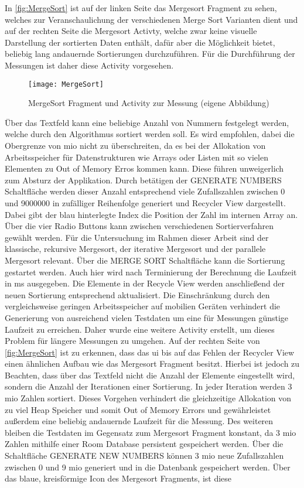 In \autoref{fig:MergeSort} ist auf der linken Seite das Mergesort Fragment zu sehen, welches zur Veranschaulichung der verschiedenen Merge Sort Varianten dient und auf der rechten Seite die Mergesort Activty, welche zwar keine visuelle Darstellung der sortierten Daten enthält, dafür aber die Möglichkeit bietet, beliebig lang andauernde Sortierungen durchzuführen. Für die Durchführung der Messungen ist daher diese Activity vorgesehen.
\begin{figure}[H]
\begin{center}
	\texttt{[image: MergeSort]}
	\caption{MergeSort Fragment und Activity zur Messung (eigene Abbildung)}
	\label{fig:MergeSort} 
\end{center}
\end{figure}
Über das Textfeld kann eine beliebige Anzahl von Nummern festgelegt werden, welche durch den Algorithmus sortiert werden soll. Es wird empfohlen, dabei die Obergrenze von  \ac{mio} nicht zu überschreiten, da es bei der Allokation von Arbeitsspeicher für Datenstrukturen wie Arrays oder Listen mit so vielen Elementen zu Out of Memory Erros kommen kann. Diese führen unweigerlich zum Absturz der Applikation. Durch betätigen der \glqq GENERATE NUMBERS\grqq{} Schaltfläche werden dieser Anzahl entsprechend viele Zufallszahlen zwischen 0 und 9000000 in zufälliger Reihenfolge generiert und Recycler View dargestellt. Dabei gibt der blau hinterlegte Index die Position der Zahl im internen Array an. Über die vier Radio Buttons kann zwischen verschiedenen Sortierverfahren gewählt werden. Für die Untersuchung im Rahmen dieser Arbeit sind der klassische, rekursive Mergesort, der iterative Mergesort und der parallele Mergesort relevant. Über die \glqq MERGE SORT\grqq{} Schaltfläche kann die Sortierung gestartet werden. Auch hier wird nach Terminierung der Berechnung die Laufzeit in \ac{ms} ausgegeben. Die Elemente in der Recycle View werden anschließend der neuen Sortierung entsprechend aktualisiert. Die Einschränkung durch den vergleichsweise geringen Arbeitsspeicher auf mobilien Geräten verhindert die Generierung von ausreichend vielen Testdaten um eine für Messungen günstige Laufzeit zu erreichen. Daher wurde eine weitere Activity erstellt, um dieses Problem für längere Messungen zu umgehen. Auf der rechten Seite von \autoref{fig:MergeSort} ist zu erkennen, dass das \ac{ui} bis auf das Fehlen der Recycler View einen ähnlichen Aufbau wie das Mergesort Fragment besitzt. Hierbei ist jedoch zu Beachten, dass über das Textfeld nicht die Anzahl der Elemente eingestellt wird, sondern die Anzahl der Iterationen einer Sortierung. In jeder Iteration werden 3 \ac{mio} Zahlen sortiert. Dieses Vorgehen verhindert die gleichzeitige Allokation von zu viel Heap Speicher und somit Out of Memory Errors und gewährleistet außerdem eine beliebig andauernde Laufzeit für die Messung. Des weiteren bleiben die Testdaten im Gegensatz zum Mergesort Fragment konstant, da 3 \ac{mio} Zahlen mithilfe einer Room Database persistent gespeichert werden. Über die Schaltfläche \glqq GENERATE NEW NUMBERS\grqq{} können 3 \ac{mio} neue Zufallszahlen zwischen 0 und 9 \ac{mio} generiert und in die Datenbank gespeichert werden. Über das blaue, kreisförmige Icon des Mergesort Fragments, ist diese 